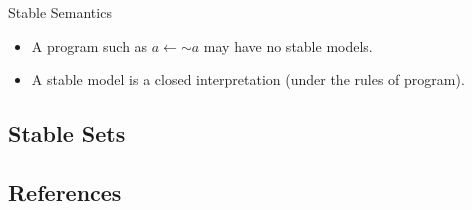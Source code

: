 \documentclass[bigger]{beamer}
\newcommand{\naf}{\ensuremath{\sim\!\!}}
\begin{document}
    \begin{frame}{Stable Semantics}
        \begin{itemize}
            \item A program such as $a \leftarrow \naf a$ may have no stable models.
            \item A stable model is a closed interpretation (under the rules of program).
        \end{itemize}
    \end{frame}

    \subsection*{Stable Sets}
    
    \begin{frame}
        \tableofcontents[currentsection]
    \end{frame}

    \subsection*{References}
    
    \begin{frame}
        \tableofcontents[currentsection]
    \end{frame}
\end{document}

